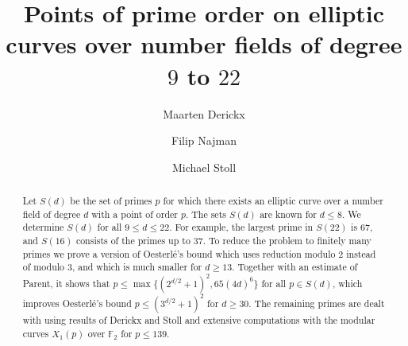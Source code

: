\documentclass[11pt,reqno]{amsart}
\title[Points of prime order over number fields of degree 9 to 22]{Points of prime order on elliptic curves over number fields of degree $9$ to $22$}
\author[Derickx]{Maarten Derickx}
\author[Najman]{Filip Najman}
\author[Stoll]{Michael Stoll}
\theoremstyle{definition}
\numberwithin{equation}{section}
\newcommand{\F}{\mathbb{F}}
\begin{document}
\begin{abstract}
Let $S(d)$ be the set of primes $p$ for which there exists an elliptic curve over a number field of degree $d$ with a point of order $p$. The sets $S(d)$ are known for $d\leq 8$. We determine $S(d)$ for all $9\leq d\leq 22$. For example, the largest prime in $S(22)$ is $67$, and $S(16)$ consists of the primes up to $37$. To reduce the problem to finitely many primes we prove a version of Oesterl\'e's bound which uses reduction modulo $2$ instead of modulo $3$, and which is much smaller for $d\geq 13$. Together with an estimate of Parent, it shows that $p\leq\max\{(2^{d/2}+1)^2,65(4d)^6\}$ for all $p\in S(d)$, which improves Oesterl\'e's bound $p\leq(3^{d/2}+1)^2$ for $d\geq30$. The remaining primes are dealt with using results of Derickx and Stoll and extensive computations with the modular curves $X_1(p)$ over $\F_2$ for $p\leq 139$.
\end{abstract}

\maketitle











\end{document}
